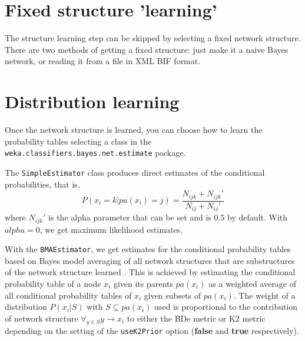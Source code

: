 \documentclass[a4paper]{article}
\begin{document}
\section{Fixed structure 'learning'}

The structure learning step can be skipped by selecting a fixed network
structure. There are two methods of getting a fixed structure: just make
it a naive Bayes network, or reading it from a file in XML BIF format.

\begin{center}
\end{center}

\section{Distribution learning\label{sec.estimate}}

Once the network structure is learned, you can choose how to learn the probability
tables selecting a class in the {\tt weka.classifiers.bayes.net.estimate} package.

\begin{center}
\end{center}


The \texttt{SimpleEstimator} class produces direct estimates of the conditional probabilities,
that is, 
$$P(x_i=k|pa(x_i)=j)=\frac{N_{ijk}+N_{ijk}'}{N_{ij}+N_{ij}'}$$ 
where $N_{ijk}'$ is the alpha parameter that can be set and is
$0.5$ by default. With $alpha=0$, we get maximum likelihood estimates.

\begin{center}
\end{center}

With the \texttt{BMAEstimator}, we get estimates for the conditional probability tables based
on Bayes model averaging of all network structures that are substructures of the
network structure learned \cite{bouck1995}. This is achieved by estimating the
conditional probability table of a node $x_i$ given its parents $pa(x_i)$ as a weighted 
average of all conditional probability tables of $x_i$ given subsets of $pa(x_i)$.
The weight of a distribution $P(x_i|S)$ with $S\subseteq pa(x_i)$ used is proportional
to the contribution of network structure $\forall_{y\in S}y\to x_i$ to either the
BDe metric or K2 metric depending on the setting of the {\tt useK2Prior} option (\textbf{false}
and \textbf{true} respectively).
\end{document}
